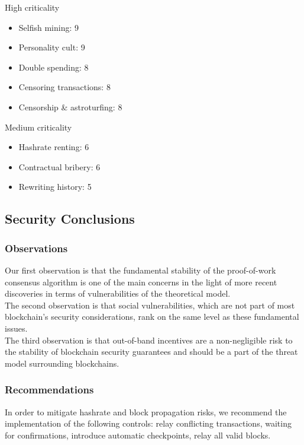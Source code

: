 \documentclass[12pt,a4paper]{article}
\begin{document}
High criticality
\begin{itemize}
  \item Selfish mining: 9
  \item Personality cult: 9
  \item Double spending: 8
  \item Censoring transactions: 8
  \item Censorship \& astroturfing: 8
\end{itemize}

Medium criticality
\begin{itemize}
  \item Hashrate renting: 6
  \item Contractual bribery: 6
  \item Rewriting history: 5
\end{itemize}

\subsection{Security Conclusions}

\subsubsection{Observations}

Our first observation is that the fundamental stability of the proof-of-work consensus algorithm is one of the main concerns in the light of more recent discoveries in terms of vulnerabilities of the theoretical model.\\

The second observation is that social vulnerabilities, which are not part of most blockchain's security considerations, rank on the same level as these fundamental issues.\\

The third observation is that out-of-band incentives are a non-negligible risk to the stability of blockchain security guarantees and should be a part of the threat model surrounding \gls{blockchain}s.\\

\subsubsection{Recommendations}

In order to mitigate \gls{hashrate} and block propagation risks, we recommend the implementation of the following controls: relay conflicting transactions, waiting for confirmations, introduce automatic checkpoints, relay all valid blocks.\\
\end{document}
